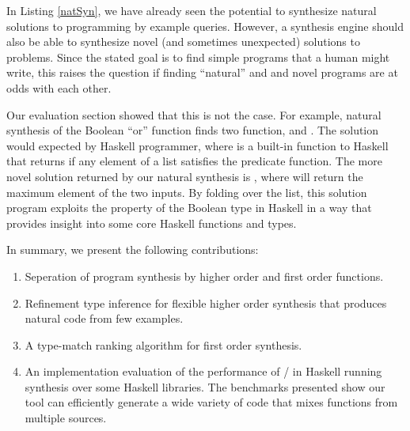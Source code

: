 In Listing \ref{natSyn}, we have already seen the potential to synthesize natural solutions to programming by example queries.
However, a synthesis engine should also be able to synthesize novel (and sometimes unexpected) solutions to problems.
Since the stated goal is to find simple programs that a human might write, this raises the question if finding ``natural'' and and novel programs are at odds with each other.

Our evaluation section showed that this is not the case.
For example, natural synthesis of the Boolean ``or'' function finds two function,  and .
The  solution would expected by Haskell programmer, where  is a built-in function to Haskell that returns  if any element of a list satisfies the predicate function.
The more novel solution returned by our natural synthesis is , where  will return the maximum element of the two inputs.
By folding over the list, this solution program exploits the  property of the Boolean type in Haskell in a way that provides insight into some core Haskell functions and types.

In summary, we present the following contributions:

\begin{enumerate}
\item Seperation of program synthesis by higher order and first order functions.
\item Refinement type inference for flexible higher order synthesis that produces natural code from few examples.
\item A type-match ranking algorithm for first order synthesis.
\item An implementation evaluation of the performance of \ourTool/ in Haskell running synthesis over some Haskell libraries. The benchmarks presented show our tool can efficiently generate a wide variety of code that mixes functions from multiple sources.
\end{enumerate}
